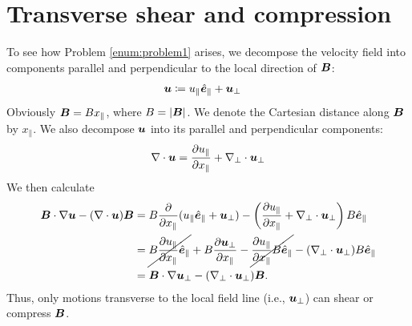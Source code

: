 \documentclass[12pt]{article}
\newcommand{\xpar}{x_\parallel}
\newcommand{\epar}{\e_\parallel}
\newcommand{\upar}{u_\parallel}
\newcommand{\uperp}{\vecu_\perp}
\begin{document}
\section{Transverse shear and compression}
To see how Problem \ref{enum:problem1} arises, we decompose the velocity field into components parallel and perpendicular to the local direction of $\bm{B}$:
\begin{align}
	\vecu &\define \upar\epar + \uperp
\end{align} 
Obviously $\vecb=B\xpar$, where $B=|\bm{B}|$. We denote the Cartesian distance along $\bm{B}$ by $\xpar$. We also decompose $\bm{u}$ into its parallel and perpendicular components:
\begin{align}
	\Div\vecu=\pderiv{\upar}{\xpar}+\nabla_\perp\cdot\uperp
\end{align}
We then calculate
\begin{align}
	\vecb\dotgrad\vecu - (\Div\vecu)\vecb&=B\pderiv{}{\xpar}(\upar\epar + \uperp) -\left(\pderiv{\upar}{\xpar}+\nabla_\perp\cdot\uperp\right)B\epar\nonumber\\
	&= \cancel{B\pderiv{\upar}{\xpar}\epar} + B\pderiv{\uperp}{\xpar} -\cancel{\pderiv{\upar}{\xpar} B\epar} - (\nabla_\perp\cdot\uperp)B\epar\nonumber\\
	&= \vecb\dotgrad\uperp - (\nabla_\perp\cdot\uperp)\vecb.
\end{align}
Thus, only motions transverse to the local field line (i.e., $\uperp$) can shear or compress $\bm{B}$.  
\end{document}
